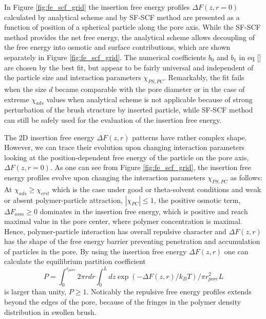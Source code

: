 \documentclass[12pt, a4paper]{article}
\begin{document}

In Figure \ref{fig:fe_scf_grid} the insertion free energy profiles $\Delta F(z,r=0)$ calculated by analytical scheme and by SF-SCF method 
are presented as a function of position of a spherical particle along the pore axis.
While the SF-SCF method provides the net free energy, the analytical scheme allows decoupling of the free energy into osmotic and surface contributions, 
which are shown separately in Figure \ref{fig:fe_scf_grid}.
The numerical coefficients $b_0$ and $b_1$ in eq \ref{} are chosen by the best fit, but appear to be fairly universal and independent of the particle size 
and interaction parameters $\chi_{PS,PC}$.
Remarkably, the fit fails when the size $d$ became comparable with the pore diameter or in the case of extreme $\chi_{ads}$ values 
when analytical scheme is not applicable because of strong perturbation 
of the brush structure by inserted particle, while SF-SCF method can still be safely used
for the evaluation of the insertion free energy.

The 2D insertion free energy $\Delta F(z,r)$ patterns have rather complex shape. However, we can trace their evolution upon changing interaction parameters
looking at the position-dependent free energy of the particle on the pore axis, $\Delta F(z,r=0)$.
As one can see from Figure \ref{fig:fe_scf_grid}, the insertion free energy profiles evolve upon changing the interaction parameters $\chi_{PS,PC}$ as follows:
At $\chi_{ads}\geq \chi_{crit}$ which is the case under good or theta-solvent conditions and weak or absent polymer-particle attraction, $|\chi_{PC}|\leq 1$, the positive osmotic
term, $\Delta F_{osm}\geq 0$ dominates in the insertion free energy, which is positive and reach maximal value in the pore center, where polymer concentration is maximal.
Hence, polymer-particle interaction has overall repulsive character and $\Delta F(z,r)$ has the shape of the free energy barrier preventing penetration and accumulation of particles in the pore.
By using the insertion free energy $\Delta F(z,r)$ one can calculate the equilibrium partition coefficient 
$$
P=\int_{0}^{r_{pore}}2\pi rdr\int_{0}^{L}dz\exp (-\Delta F(z,r)/k_BT)/\pi r^{2}_{pore}L
$$
is larger than unity, $P\geq 1$. Noticably the repulsive free energy profiles extends beyond the edges of the pore, because of the fringes in the polymer density distribution in swollen brush.
\end{document}

